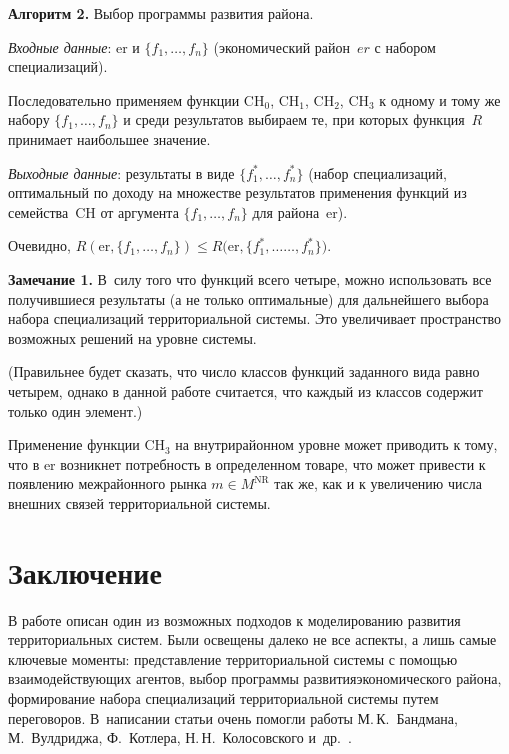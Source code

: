 \begin{multicols}{2}
\medskip

\noindent
\textbf{Алгоритм 2.} Выбор программы развития района.

\textit{Входные данные}: er и $\{f_1, \ldots ,f_n\}$ (экономический район~$er$ 
с набором специализаций).
  
  Последовательно применяем функции CH$_0$, CH$_1$, CH$_2$, CH$_3$ к 
одному и тому же набору $\{f_1, \ldots ,f_n\}$ и среди результатов выбираем те, 
при которых функция~$R$ принимает наибольшее значение. 

\textit{Выходные данные}: результаты в виде $\{f_1^*, \ldots , f_n^*\}$ (набор 
специализаций, оптимальный по доходу на множестве результатов применения 
функций из семейства~CH от аргумента $\{f_1, \ldots , f_n\}$ для 
района~er).

Очевидно, $R(\mathrm{er},\{f_1, \ldots , f_n\})\leq R(\mathrm{er},\{f_1^*, \ldots$\linebreak $\ldots , f_n^*\})$.

\medskip

\noindent
\textbf{Замечание 1.} В~силу того что функций всего четыре, можно 
использовать все получившиеся результаты (а не только оптимальные) для 
дальнейшего выбора набора специализаций территориальной системы. Это 
увеличивает пространство возможных решений на уровне системы. 
  
  (Правильнее будет сказать, что число классов функций заданного вида равно 
четырем, однако в данной работе считается, что каждый из классов содержит 
только один элемент.)
  \medskip
  
  Применение функции CH$_3$ на внутрирайонном уровне может приводить к 
тому, что в er возникнет потребность в определенном товаре, что может 
привести к появлению межрайонного рынка $m\in M^{\mathrm{NR}}$ так же, как и к 
увеличению числа внешних связей территориальной системы.

\section{Заключение}

  В работе описан один из возможных подходов к моделированию развития 
территориальных систем. Были освещены далеко не все аспекты, а лишь самые 
ключевые моменты: представление территориальной системы с помощью 
взаимодействующих агентов, выбор программы развития\linebreak экономического 
района, формирование набора специализаций территориальной системы путем 
переговоров. В~написании статьи очень помогли работы М.\,К.~Бандмана, 
М.~Вулдриджа, Ф.~Котлера, Н.\,Н.~Колосовского 
и~др.~\cite{1-chu, 2-chu, 6-chu, 7-chu}. 
  

\end{multicols}
